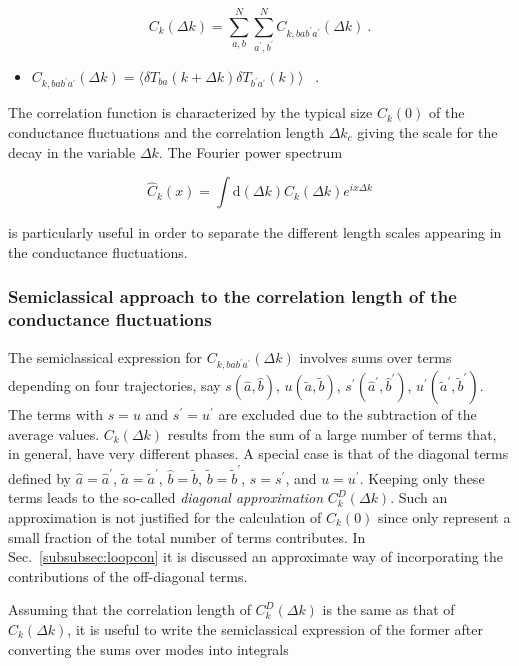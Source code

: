 \documentclass[a4paper,10pt]{article}
\newcommand{\dif}{\mathrm{d}}
\newcommand{\nin}{\noindent}
\newcommand{\be}{\begin{equation}}
\newcommand{\ee}{\end{equation}}
\newcommand{\dlk}{\Delta k}
\newcommand{\dlT}{\delta T}
\begin{document}
\be
C_k( \dlk ) = \sum_{a,b}^{N} \sum_{a^{\prime},b^{\prime}}^{N} 
C_{k,bab^{\prime}a^{\prime}}( \dlk ) \ .
\label{eq:Cdef}
\ee

\begin{itemize}

\item $C_{k,bab^{\prime}a^{\prime}}( \dlk ) =
\langle \dlT_{ba}(k+\dlk) \dlT_{b^{\prime}a^{\prime}}(k) \rangle$ \ .

\end{itemize}

\nin The correlation function is characterized by the typical size 
$C_k(0)$ of the conductance fluctuations and the correlation length $\dlk_c$ giving the scale for the decay in the variable $\dlk$. The Fourier power spectrum

\be
\widehat{C}_k(x) = \int \dif (\dlk) C_k(\dlk) e^{ix \dlk} 
\label{eq:Chatdef}
\ee

\nin is particularly useful in order to separate the different length scales appearing in the conductance fluctuations.

\subsubsection{Semiclassical approach to the correlation length of the conductance fluctuations}
\label{subsubsec:cf}

The semiclassical expression for $C_{k,bab^{\prime}a^{\prime}}(\dlk)$  involves sums over terms depending on four trajectories, say $s({\hat a},{\hat b})$, $u({\tilde a},{\tilde b})$,
$s^{\prime}({\hat a}^{\prime},{\hat b}^{\prime})$, 
$u^{\prime}({\tilde a}^{\prime},{\tilde b}^{\prime})$. The terms with
$s=u$ and $s^{\prime}=u^{\prime}$ are excluded due to the subtraction of the average values. $C_k( \dlk )$ results from the sum of a large number of terms that, in general, have very different phases. A special case is that of the diagonal terms defined by ${\hat a}={\hat a}^{\prime}$, 
${\tilde a}={\tilde a}^{\prime}$, ${\hat b}={\tilde b}$,
${\tilde b}={\tilde b}^{\prime}$, $s=s^{\prime}$, and $u=u^{\prime}$. Keeping only these terms leads to the so-called {\it diagonal approximation} $C_k^D(\dlk)$. Such an approximation is not justified for the calculation of $C_k(0)$ since only represent a small fraction of the total number of terms contributes. In Sec.~\ref{subsubsec:loopcon} it is discussed an approximate way of incorporating  the contributions of the off-diagonal terms.   

\nin Assuming that the correlation length of $C_k^D(\dlk)$ is the same as that of $C_k(\dlk)$, it is useful to write the semiclassical expression of the former after converting the sums over modes into integrals
\end{document}
